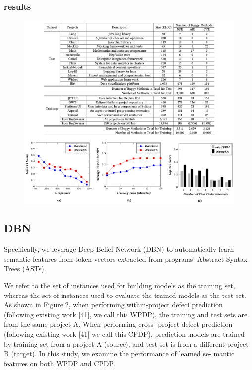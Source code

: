\documentclass{article}
\begin{document}
\subsubsection{results}
\begin{figure}[ht]
\vskip 0.2in
\begin{center}
\centerline{\includegraphics[width=\columnwidth]{Images/Bug2-1.png}}
\label{icml-historical}
\end{center}
\vskip -0.2in
\end{figure}
\subsection{DBN}
Specifically, we leverage Deep Belief Network (DBN) to automatically learn semantic features from token vectors extracted from programs’ Abstract Syntax Trees (ASTs).

We refer to the set of instances used for building models as the training set, whereas the set of instances used to evaluate the trained models as the test set. As shown in Figure 2, when performing within-project defect prediction (following existing work [41], we call this WPDP), the training and test sets are from the same project A. When performing cross- project defect prediction (following existing work [41] we call this CPDP), prediction models are trained by training set from a project A (source), and test set is from a different project B (target).
In this study, we examine the performance of learned se- mantic features on both WPDP and CPDP.
\end{document}
